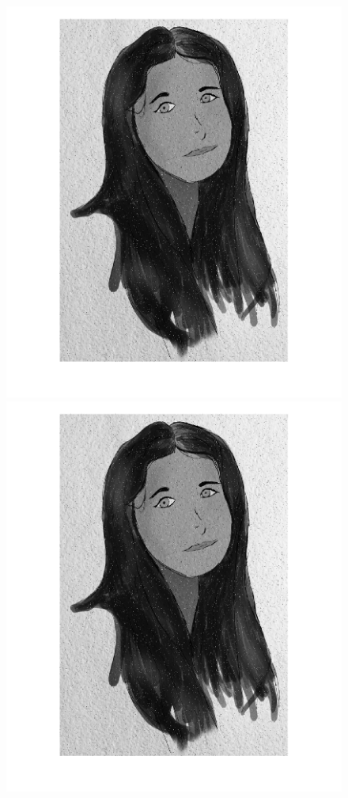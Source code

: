 \begin{figure}[htb] \centering
\includegraphics[scale=0.15,trim={3cm 0cm 3cm 0cm},clip]{Pictures/Esempi di utilizzo/Esempio 5/ami_originale_resize.png}
\includegraphics[scale=0.15,trim={3cm 0cm 3cm 0cm},clip]{Pictures/Esempi di utilizzo/Esempio 5/ami_filtrata_sigma2_deltat0_2_resize.png}

\end{figure}
